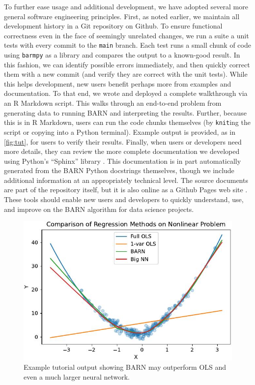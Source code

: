 \documentclass[12pt]{article}
\begin{document}
To further ease usage and additional development, we have adopted several more general software engineering principles.  First, as noted earlier, we maintain all development history in a Git repository on Github.  To ensure functional correctness even in the face of seemingly unrelated changes, we run a suite a unit tests with every commit to the \texttt{main} branch.  Each test runs a small chunk of code using \texttt{barmpy} as a library and compares the output to a known-good result.  In this fashion, we can identify possible errors immediately, and then quickly correct them with a new commit (and verify they are correct with the unit tests).  While this helps development, new users benefit perhaps more from examples and documentation.  To that end, we wrote and deployed a complete walkthrough via an R Markdown \cite{baumer2015r} script.  This walks through an end-to-end problem from generating data to running BARN and interpreting the results.  Further, because this is in R Markdown, users can run the code chunks themselves (by \texttt{knit}ing the script or copying into a Python terminal).  Example output is provided, as in \autoref{fig:tut}, for users to verify their results.  Finally, when users or developers need more details, they can review the more complete documentation we developed using Python's ``Sphinx'' library \cite{brandl2021sphinx}.  This documentation is in part automatically generated from the BARN Python docstrings themselves, though we include additional information at an appropriately technical level.  The source documents are part of the repository itself, but it is also online as a Github Pages web site \cite{vanboxel2023barmdoc}.   These tools should enable new users and developers to quickly understand, use, and improve on the BARN algorithm for data science projects.

\begin{figure}[htb]
\centering
    \includegraphics[scale=0.75]{figs/tut.jpg}
    \caption{Example tutorial output showing BARN may outperform OLS and even a much larger neural network.}
    \label{fig:tut}
\end{figure}
\end{document}

